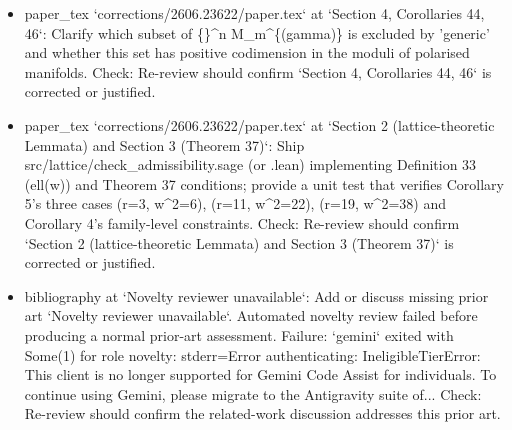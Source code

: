 \documentclass[11pt]{article}
\begin{document}
\begin{itemize}[leftmargin=*]
  \item [open] paper\_tex `corrections/2606.23622/paper.tex` at `Section 4, Corollaries 44, 46`: Clarify which subset of \{\}\^{}n M\_m\^{}\{(gamma)\} is excluded by 'generic' and whether this set has positive codimension in the moduli of polarised manifolds. Check: Re-review should confirm `Section 4, Corollaries 44, 46` is corrected or justified.
  \item [open] paper\_tex `corrections/2606.23622/paper.tex` at `Section 2 (lattice-theoretic Lemmata) and Section 3 (Theorem 37)`: Ship src/lattice/check\_admissibility.sage (or .lean) implementing Definition 33 (ell(w)) and Theorem 37 conditions; provide a unit test that verifies Corollary 5's three cases (r=3, w\^{}2=6), (r=11, w\^{}2=22), (r=19, w\^{}2=38) and Corollary 4's family-level constraints. Check: Re-review should confirm `Section 2 (lattice-theoretic Lemmata) and Section 3 (Theorem 37)` is corrected or justified.
  \item [open] bibliography at `Novelty reviewer unavailable`: Add or discuss missing prior art `Novelty reviewer unavailable`. Automated novelty review failed before producing a normal prior-art assessment. Failure: `gemini` exited with Some(1) for role novelty: stderr=Error authenticating: IneligibleTierError: This client is no longer supported for Gemini Code Assist for individuals. To continue using Gemini, please migrate to the Antigravity suite of... Check: Re-review should confirm the related-work discussion addresses this prior art.
\end{itemize}
\end{document}
